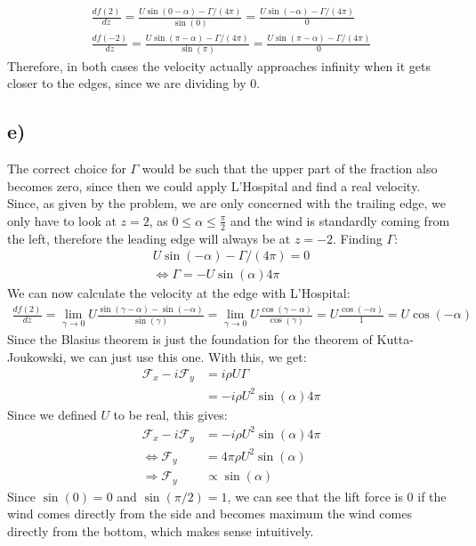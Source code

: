 \documentclass{article}
\begin{document}
\begin{align*}
    \frac{df(2)}{dz}
=
\frac{U \sin(0 - \alpha) - \Gamma/(4\pi)}
{\sin(0)}=\frac{U \sin(-\alpha) - \Gamma/(4\pi)}
{0}\\
\frac{df(-2)}{dz}
=
\frac{U \sin(\pi - \alpha) - \Gamma/(4\pi)}
{\sin(\pi)}=\frac{U \sin(\pi-\alpha) - \Gamma/(4\pi)}
{0}
\end{align*}
Therefore, in both cases the velocity actually approaches infinity when it gets closer to the edges, since we are dividing by 0. 

\subsection*{e)}
The correct choice for $\Gamma$ would be such that the upper part of the fraction also becomes zero, since then we could apply L'Hospital and find a real velocity. Since, as given by the problem, we are only concerned with the trailing edge, we only have to look at $z=2$, as $0\leq\alpha \leq \frac{\pi}{2}$ and the wind is standardly coming from the left, therefore the leading edge will always be at $z=-2$. Finding $\Gamma$:
\begin{align*}
    U\sin(-\alpha)-\Gamma /(4\pi)=0\\
    \Leftrightarrow \Gamma =-{U\sin(\alpha)}{4\pi}
\end{align*}
We can now calculate the velocity at the edge with L'Hospital: 
\begin{align*}
    \frac{df(2)}{dz}=\lim _{\gamma \to 0 }U\frac{\sin(\gamma -\alpha)-\sin(-\alpha)}{\sin(\gamma)}=\lim _{\gamma \to 0 }U\frac{\cos(\gamma -\alpha)}{\cos(\gamma)}=U\frac{\cos(-\alpha)}{1}=U\cos (-\alpha)
\end{align*}
Since the Blasius theorem is just the foundation for the theorem of Kutta-Joukowski, we can just use this one. With this, we get: 
\begin{align*}
    \mathcal F_x-i\mathcal F_y&=i\rho U\Gamma \\
    &=-i\rho U^2{\sin(\alpha)}{4\pi}
\end{align*}
Since we defined $U$ to be real, this gives: 
\begin{align*}
        \mathcal F_x-i\mathcal F_y&=-i\rho U^2{\sin(\alpha)}{4\pi} \\
    \Leftrightarrow \mathcal F_y&=4\pi \rho U^2\sin (\alpha )\\
    \Rightarrow \mathcal F_y&\propto \sin(\alpha)
\end{align*}
Since $\sin (0)=0$ and $\sin(\pi/2)=1$, we can see that the lift force is 0 if the wind comes directly from the side and becomes maximum the wind comes directly from the bottom, which makes sense intuitively. 
\end{document}
